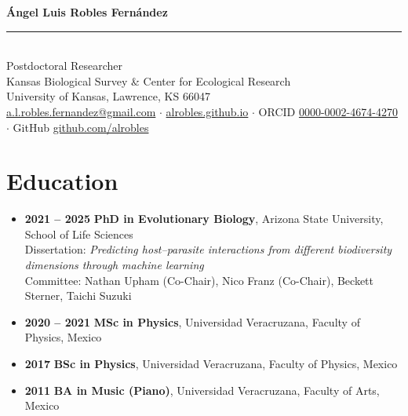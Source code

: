 \documentclass[11pt,a4paper]{article}
\begin{document}
\begin{center}
  {\Huge\bfseries Ángel Luis Robles Fernández}\\[0.3em]
  \rule{0.5\linewidth}{0.4pt}\\[0.6em]
  {\large Postdoctoral Researcher}\\
  Kansas Biological Survey \& Center for Ecological Research\\
  University of Kansas, Lawrence, KS 66047\\[0.4em]
  {\small
  \href{mailto:a.l.robles.fernandez@gmail.com}{a.l.robles.fernandez@gmail.com} $\cdot$
  \href{https://alrobles.github.io}{alrobles.github.io} $\cdot$
  ORCID \href{https://orcid.org/0000-0002-4674-4270}{0000-0002-4674-4270} $\cdot$
  GitHub \href{https://github.com/alrobles}{github.com/alrobles}}
\end{center}

\vspace{0.5em}

\section*{Education}

\begin{itemize}[leftmargin=0pt]
\item \textbf{2021 -- 2025} \quad \textbf{PhD in Evolutionary Biology}, Arizona State University, School of Life Sciences\\
      Dissertation: \textit{Predicting host--parasite interactions from different biodiversity dimensions through machine learning}\\
      Committee: Nathan Upham (Co-Chair), Nico Franz (Co-Chair), Beckett Sterner, Taichi Suzuki

\item \textbf{2020 -- 2021} \quad \textbf{MSc in Physics}, Universidad Veracruzana, Faculty of Physics, Mexico

\item \textbf{2017} \quad \textbf{BSc in Physics}, Universidad Veracruzana, Faculty of Physics, Mexico

\item \textbf{2011} \quad \textbf{BA in Music (Piano)}, Universidad Veracruzana, Faculty of Arts, Mexico
\end{itemize}
\end{document}
